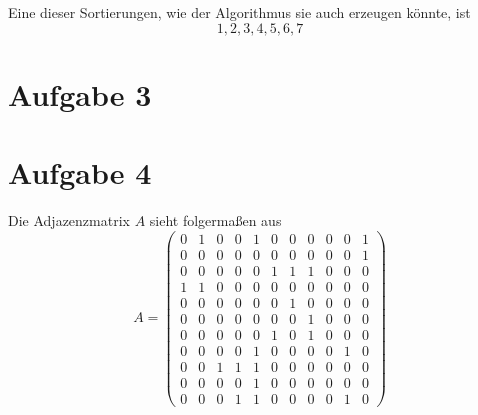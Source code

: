 \documentclass[10pt,a4paper]{article}
\begin{document}
Eine dieser Sortierungen, wie der Algorithmus sie auch erzeugen könnte, ist
\begin{equation}
  1, 2, 3, 4, 5, 6, 7
\end{equation}

\section{Aufgabe 3}

\section{Aufgabe 4}
Die Adjazenzmatrix $A$ sieht folgermaßen aus
\setcounter{MaxMatrixCols}{20}
\begin{equation}
  A =
  \begin{pmatrix}
    0 & 1 & 0 & 0 & 1 & 0 & 0 & 0 & 0 & 0 & 1\\
    0 & 0 & 0 & 0 & 0 & 0 & 0 & 0 & 0 & 0 & 1\\
    0 & 0 & 0 & 0 & 0 & 1 & 1 & 1 & 0 & 0 & 0\\
    1 & 1 & 0 & 0 & 0 & 0 & 0 & 0 & 0 & 0 & 0\\
    0 & 0 & 0 & 0 & 0 & 0 & 1 & 0 & 0 & 0 & 0\\
    0 & 0 & 0 & 0 & 0 & 0 & 0 & 1 & 0 & 0 & 0\\
    0 & 0 & 0 & 0 & 0 & 1 & 0 & 1 & 0 & 0 & 0\\
    0 & 0 & 0 & 0 & 1 & 0 & 0 & 0 & 0 & 1 & 0\\
    0 & 0 & 1 & 1 & 1 & 0 & 0 & 0 & 0 & 0 & 0\\
    0 & 0 & 0 & 0 & 1 & 0 & 0 & 0 & 0 & 0 & 0\\
    0 & 0 & 0 & 1 & 1 & 0 & 0 & 0 & 0 & 1 & 0
  \end{pmatrix}
\end{equation}
\end{document}
